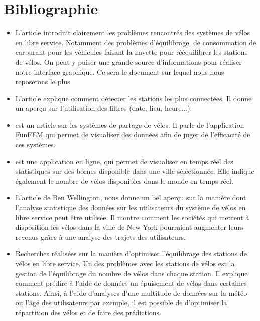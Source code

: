 \documentclass[12pt]{article}
\begin{document}
	\section{Bibliographie}
		\begin{itemize}
			\item L'article \cite{Oli16} introduit clairement les problèmes rencontrés
			des systèmes de vélos en libre service. Notamment des problèmes d'équilibrage,
			de consommation de carburant pour les véhicules faisant la navette pour
			rééquilibrer les stations de vélos. On peut y puiser une grande source
			d'informations pour réaliser notre interface graphique. Ce sera le document sur
			lequel nous nous reposerons le plus.

			\item L'article \cite{Ali14} explique comment détecter les stations les plus
			connectées. Il donne un aperçu sur  l'utilisation des filtres (date, lieu, heure...).

			\item \cite{BC16} est un article sur les systèmes de partage de vélos. Il parle
			de l'application FunFEM qui permet de visualiser des données afin de juger de
			l'efficacité de ces systèmes.

			\item \cite{BSM17} est une application en ligne, qui permet de visualiser en
			temps réel des statistiques sur des bornes disponible dans une ville
			sélectionnée.  Elle indique également le nombre de vélos disponibles dans le
			monde en temps réel.

			\item L'article \cite{BW} de Ben Wellington, nous donne un bel aperçu sur la
			manière dont l'analyse statistique des données sur les utilisateurs du système de
			vélos en libre service peut être utilisée. Il montre comment les sociétés qui
			mettent à disposition les vélos dans la ville de New York pourraient augmenter
			leurs revenus grâce à une analyse des trajets des utilisateurs.

			\item \cite{JL} Recherches réalisées sur la manière d'optimiser l'équilibrage
			des stations de vélos en libre service. Un des problèmes avec les stations de vélos
			est la gestion de l'équilibrage du nombre de  vélos dans chaque station. Il explique
			comment prédire à l'aide de données un épuisement de vélos dans certaines stations.
			Ainsi, à l'aide d'analyses d'une multitude de données sur la météo ou l'âge des
			utilisateurs par exemple, il est possible de d'optimiser la répartition des vélos et
			de faire des prédictions.


\end{itemize}
\end{document}
